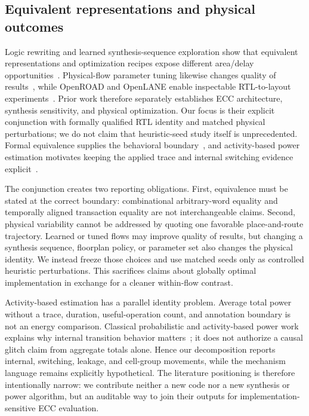 \documentclass[conference,10pt]{IEEEtran}
\begin{document}
\subsection{Equivalent representations and physical outcomes}

Logic rewriting and learned synthesis-sequence exploration show that equivalent representations and optimization recipes expose different area/delay opportunities~\cite{mishchenko2006,hosny2020,neto2019,grosnit2022}. Physical-flow parameter tuning likewise changes quality of results~\cite{kwon2019}, while OpenROAD and OpenLANE enable inspectable RTL-to-layout experiments~\cite{ajayi2019,shalan2020}. Prior work therefore separately establishes ECC architecture, synthesis sensitivity, and physical optimization. Our focus is their explicit conjunction with formally qualified RTL identity and matched physical perturbations; we do not claim that heuristic-seed study itself is unprecedented. Formal equivalence supplies the behavioral boundary~\cite{kuehlmann1997,kuehlmann2002}, and activity-based power estimation motivates keeping the applied trace and internal switching evidence explicit~\cite{najm1993,najm1994}.

The conjunction creates two reporting obligations. First, equivalence must be stated at the correct boundary: combinational arbitrary-word equality and temporally aligned transaction equality are not interchangeable claims. Second, physical variability cannot be addressed by quoting one favorable place-and-route trajectory. Learned or tuned flows may improve quality of results, but changing a synthesis sequence, floorplan policy, or parameter set also changes the physical identity. We instead freeze those choices and use matched seeds only as controlled heuristic perturbations. This sacrifices claims about globally optimal implementation in exchange for a cleaner within-flow contrast.

Activity-based estimation has a parallel identity problem. Average total power without a trace, duration, useful-operation count, and annotation boundary is not an energy comparison. Classical probabilistic and activity-based power work explains why internal transition behavior matters~\cite{najm1993,najm1994}; it does not authorize a causal glitch claim from aggregate totals alone. Hence our decomposition reports internal, switching, leakage, and cell-group movements, while the mechanism language remains explicitly hypothetical. The literature positioning is therefore intentionally narrow: we contribute neither a new code nor a new synthesis or power algorithm, but an auditable way to join their outputs for implementation-sensitive ECC evaluation.
\end{document}
